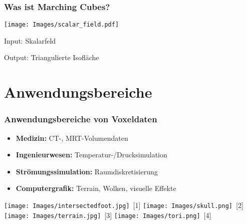 \documentclass{beamer}
\begin{document}
\begin{frame}[t]
  \frametitle{Was ist Marching Cubes?}
  \centering
  \vspace{0.5cm}

  \vspace{-0.5cm}
  \texttt{[image: Images/scalar\_field.pdf]}

  \vspace{-0.5em}

  \begin{minipage}[t]{0.48\textwidth}
    \hspace*{2em}
    \raggedright
    Input: Skalarfeld
  \end{minipage}
  \hfill
  \begin{minipage}[t]{0.48\textwidth}
    \raggedleft
    Output: Triangulierte Isofläche
  \end{minipage}
\end{frame}

\section{Anwendungsbereiche}
\begin{frame}[t]
  \frametitle{Anwendungsbereiche von Voxeldaten}
  \begin{itemize}
    \item \textbf{Medizin:} CT-, MRT-Volumendaten
    \item \textbf{Ingenieurwesen:} Temperatur-/Drucksimulation
    \item \textbf{Strömungssimulation:} Raumdiskretisierung
    \item \textbf{Computergrafik:} Terrain, Wolken, visuelle Effekte
  \end{itemize}
  \vspace{0.4cm}
  \centering
  \texttt{[image: Images/intersectedfoot.jpg]}~\scriptsize[1]
  \texttt{[image: Images/skull.png]}~\scriptsize[2]
  \texttt{[image: Images/terrain.jpg]}~\scriptsize[3]
  \texttt{[image: Images/tori.png]}~\scriptsize[4]
\end{frame}
\end{document}
